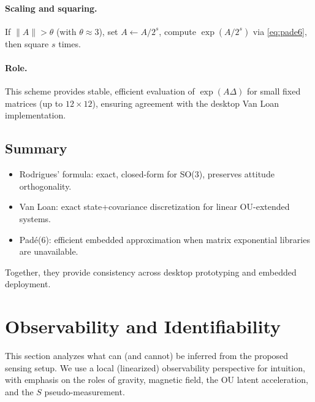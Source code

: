 \documentclass[10pt]{extarticle}
\begin{document}
\paragraph{Scaling and squaring.}
If $\|A\|>\theta$ (with $\theta\approx 3$), set $A\leftarrow A/2^s$,
compute $\exp(A/2^s)$ via \eqref{eq:pade6}, then square $s$ times.

\paragraph{Role.}
This scheme provides stable, efficient evaluation of $\exp(A\Delta)$ for
small fixed matrices (up to $12\times 12$), ensuring agreement with the
desktop Van Loan implementation.

\subsection{Summary}
\begin{itemize}
\item Rodrigues’ formula: exact, closed-form for SO(3), preserves attitude orthogonality.
\item Van Loan: exact state+covariance discretization for linear OU-extended systems.
\item Pad\'e(6): efficient embedded approximation when matrix exponential libraries are unavailable.
\end{itemize}
Together, they provide consistency across desktop prototyping and embedded deployment.

\section{Observability and Identifiability}
\label{sec:observability}

This section analyzes what can (and cannot) be inferred from the proposed sensing setup.
We use a local (linearized) observability perspective for intuition, with emphasis on
the roles of gravity, magnetic field, the OU latent acceleration, and the $S$ pseudo-measurement.
\end{document}

